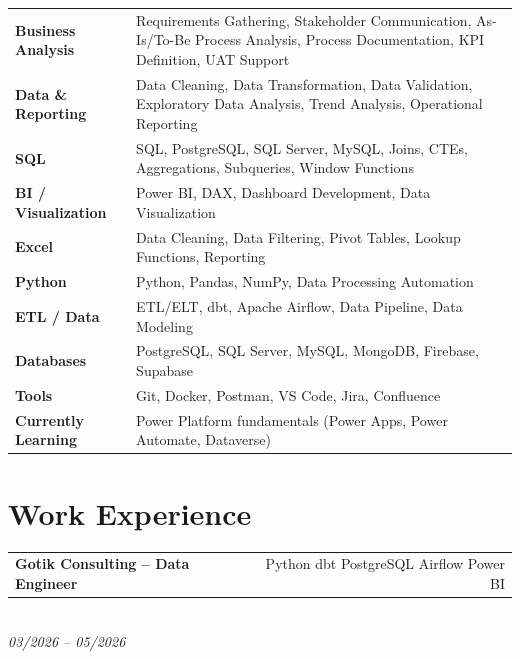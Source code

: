 \documentclass[10pt,a4paper]{article}
\newcommand{\entry}[3]{%
    \noindent
    \begin{tabularx}{\linewidth}{X r}
        \textbf{\color{primary}#1} &
        {\scriptsize\color{gray}#2}
    \end{tabularx}\\[-2pt]
    {\scriptsize\textit{\color{gray}#3}}
    \vspace{0.5pt}
}
\begin{document}
{\small

\begin{tabularx}{\linewidth}{@{}lX@{}}

\textbf{Business Analysis}
&
Requirements Gathering, Stakeholder Communication, As-Is/To-Be Process
Analysis, Process Documentation, KPI Definition, UAT Support
\\[1pt]

\textbf{Data \& Reporting}
&
Data Cleaning, Data Transformation, Data Validation, Exploratory Data
Analysis, Trend Analysis, Operational Reporting
\\[1pt]

\textbf{SQL}
&
SQL, PostgreSQL, SQL Server, MySQL, Joins, CTEs, Aggregations,
Subqueries, Window Functions
\\[1pt]

\textbf{BI / Visualization}
&
Power BI, DAX, Dashboard Development, Data Visualization
\\[1pt]

\textbf{Excel}
&
Data Cleaning, Data Filtering, Pivot Tables, Lookup Functions, Reporting
\\[1pt]

\textbf{Python}
&
Python, Pandas, NumPy, Data Processing Automation
\\[1pt]

\textbf{ETL / Data}
&
ETL/ELT, dbt, Apache Airflow, Data Pipeline, Data Modeling
\\[1pt]

\textbf{Databases}
&
PostgreSQL, SQL Server, MySQL, MongoDB, Firebase, Supabase
\\[1pt]

\textbf{Tools}
&
Git, Docker, Postman, VS Code, Jira, Confluence
\\[1pt]

\textbf{Currently Learning}
&
Power Platform fundamentals (Power Apps, Power Automate, Dataverse)

\end{tabularx}

}


\section*{Work Experience}

\entry
{Gotik Consulting -- Data Engineer}
{Python \textbar{} dbt \textbar{} PostgreSQL \textbar{} Airflow \textbar{} Power BI}
{03/2026 -- 05/2026}
\end{document}
